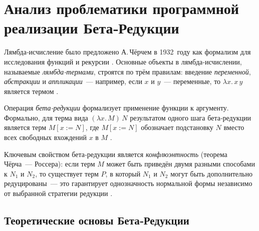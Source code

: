 \chapter{Анализ проблематики программной реализации Бета‑Редукции}
\label{chapter1}

Лямбда‑исчисление было предложено А. Чёрчем в 1932 году как формализм для исследования функций и рекурсии \cite{ChurchRosser}. Основные объекты в лямбда‑исчислении, называемые \emph{лямбда‑термами}, строятся по трём правилам: введение \emph{переменной}, \emph{абстракции} и \emph{аппликации} — например, если $x$ и $y$ — переменные, то $\lambda x.\,x\,y$ является термом .  

Операция \emph{бета‑редукции} формализует применение функции к аргументу. Формально, для терма вида $(\lambda x.\,M)\,N$ результатом одного шага бета‑редукции является терм $M[x := N]$, где $M[x := N]$ обозначает подстановку $N$ вместо всех свободных вхождений $x$ в $M$ .  

Ключевым свойством бета‑редукции является \emph{конфлюэнтность} (теорема Чёрча — Россера): если терм $M$ может быть приведён двумя разными способами к $N_1$ и $N_2$, то существует терм $P$, в который $N_1$ и $N_2$ могут быть дополнительно редуцированы — это гарантирует однозначность нормальной формы независимо от выбранной стратегии редукции .  
\section{Теоретические основы Бета‑Редукции}
\label{sec:theory-beta}


